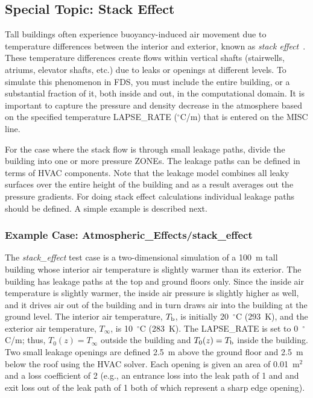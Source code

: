 \documentclass[11pt]{book}
\begin{document}
\subsection{Special Topic: Stack Effect}
\label{info:stackeffect}

Tall buildings often experience buoyancy-induced air movement due to temperature differences between the interior and exterior, known as {\em stack effect}~\cite{Klote_Milke}. These temperature differences create flows within vertical shafts (stairwells, atriums, elevator shafts, etc.) due to leaks or openings at different levels.  To simulate this phenomenon in FDS, you must include the entire building, or a substantial fraction of it, both inside and out, in the computational domain. It
is important to capture the pressure and density decrease in the atmosphere based on the specified temperature {\ct LAPSE\_RATE} ($^\circ$C/m) that is entered on the {\ct MISC} line.

For the case where the stack flow is through small leakage paths, divide the building into one or more pressure {\ct ZONE}s.  The leakage paths can be defined in terms of HVAC components.  Note that the leakage model combines all leaky surfaces over the entire height of the building and as a result averages out the pressure gradients. For doing stack effect calculations individual leakage paths should be defined. A simple example is described next.

\subsubsection{Example Case: Atmospheric\_Effects/stack\_effect}

The {\em stack\_effect} test case is a two-dimensional simulation of a 100~m tall building whose interior air temperature is slightly warmer than its exterior. The building has leakage paths at the top and ground floors only.  Since the inside air temperature is slightly warmer, the inside air pressure is slightly higher as well, and it drives air out of the building and in turn draws air into the building at the ground level.
The interior air temperature, $T_{\rm b}$, is initially 20~$^\circ$C (293~K), and the exterior air temperature, $T_\infty$, is
10~$^\circ$C (283~K). The {\ct LAPSE\_RATE} is set to 0~$^\circ$C/m; thus, $T_0(z)=T_\infty$ outside the building and $T_0(z)=T_{\rm b}$ inside the building. Two small leakage openings are defined 2.5~m above the ground floor and 2.5~m below the roof using the HVAC solver.  Each opening is given an area of 0.01~m$^2$ and a loss coefficient of 2 (e.g., an entrance loss into the leak path of 1 and and exit loss out of the leak path of 1 both of which represent a sharp edge opening).
\end{document}
